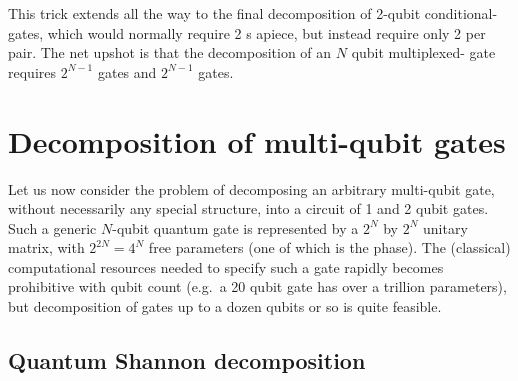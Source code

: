 This trick extends all the way to the final decomposition of 2-qubit conditional- gates, which would normally require 2 s apiece, but instead require only 2 per pair. The net upshot is that the decomposition of an $N$ qubit multiplexed- gate requires $2^{N-1}$  gates and $2^{N-1}$  gates.









\clearpage
\section{Decomposition of multi-qubit gates}

Let us now consider the problem of decomposing an arbitrary multi-qubit gate, without necessarily any special structure, into a circuit of 1 and 2 qubit gates.  
Such a generic $N$-qubit quantum gate is represented by a $2^N$ by $2^N$ unitary matrix, with $2^{2N}=4^N$ free parameters (one of which is the phase).  The (classical) computational resources needed to specify such a gate rapidly becomes prohibitive with qubit count (e.g.~a 20 qubit gate has over a trillion parameters), but decomposition of gates up to a dozen qubits or so is quite feasible.
 




\subsection{Quantum Shannon decomposition}
\newcommand{\bigzero}{\mbox{\normalfont\Large 0}}

